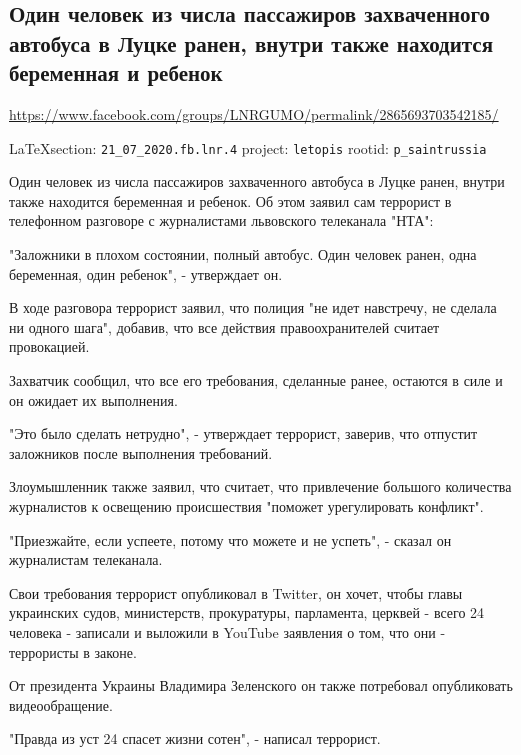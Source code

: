  
 
\subsection{Один человек из числа пассажиров захваченного автобуса в Луцке ранен, внутри также находится беременная и ребенок}
\label{sec:21_07_2020.fb.lnr.4}
\url{https://www.facebook.com/groups/LNRGUMO/permalink/2865693703542185/}
  
\vspace{0.5cm}
{\small\LaTeX section: \verb|21_07_2020.fb.lnr.4| project: \verb|letopis| rootid: \verb|p_saintrussia|}
\vspace{0.5cm}
  
Один человек из числа пассажиров захваченного автобуса в Луцке ранен, внутри
также находится беременная и ребенок.  Об этом заявил сам террорист в
телефонном разговоре с журналистами львовского телеканала "НТА":

"Заложники в плохом состоянии, полный автобус.  Один человек ранен, одна
беременная, один ребенок", - утверждает он.

В ходе разговора террорист заявил, что полиция "не идет навстречу, не сделала
ни одного шага", добавив, что все действия правоохранителей считает
провокацией.

Захватчик сообщил, что все его требования, сделанные ранее, остаются в силе и
он ожидает их выполнения.

"Это было сделать нетрудно", - утверждает террорист, заверив, что отпустит
заложников после выполнения требований.

Злоумышленник также заявил, что считает, что привлечение большого количества
журналистов к освещению происшествия "поможет урегулировать конфликт".

"Приезжайте, если успеете, потому что можете и не успеть", - сказал он
журналистам телеканала.

Свои требования террорист опубликовал в Twitter, он хочет, чтобы главы
украинских судов, министерств, прокуратуры, парламента, церквей - всего 24
человека - записали и выложили в YouTube заявления о том, что они - террористы
в законе.

От президента Украины Владимира Зеленского он также потребовал опубликовать
видеообращение.

"Правда из уст 24 спасет жизни сотен", - написал террорист.


